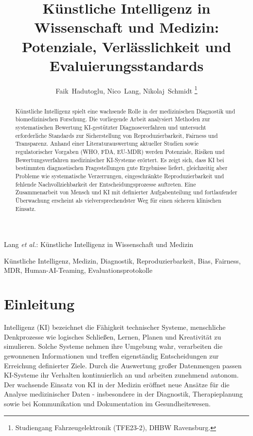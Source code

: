 \documentclass[lettersize,journal]{IEEEtran}
\begin{document}
\title{Künstliche Intelligenz in Wissenschaft und Medizin: 
	Potenziale, Verlässlichkeit und Evaluierungsstandards}

\author{Faik~Hadutoglu, Nico~Lang, Nikolaj~Schmidt%
	\thanks{Studiengang Fahrzeugelektronik (TFE23-2), DHBW Ravensburg.}%
}


%
{Lang \MakeLowercase{\textit{et al.}}: Künstliche Intelligenz in Wissenschaft und Medizin}

	
	\maketitle
	

\begin{abstract}
	Künstliche Intelligenz spielt eine wachsende Rolle in der medizinischen Diagnostik und biomedizinischen Forschung. Die vorliegende Arbeit analysiert Methoden zur systematischen Bewertung KI-gestützter Diagnoseverfahren und untersucht erforderliche Standards zur Sicherstellung von Reproduzierbarkeit, Fairness und Transparenz. Anhand einer Literaturauswertung aktueller Studien sowie regulatorischer Vorgaben (WHO, FDA, EU-MDR) werden Potenziale, Risiken und Bewertungsverfahren medizinischer KI-Systeme erörtert. Es zeigt sich, dass KI bei bestimmten diagnostischen Fragestellungen gute Ergebnisse liefert, gleichzeitig aber Probleme wie systematische Verzerrungen, eingeschränkte Reproduzierbarkeit und fehlende Nachvollziehbarkeit der Entscheidungsprozesse auftreten. Eine Zusammenarbeit von Mensch und KI mit definierter Aufgabenteilung und fortlaufender Überwachung erscheint als vielversprechendster Weg für einen sicheren klinischen Einsatz.
\end{abstract}




\begin{IEEEkeywords}
	Künstliche Intelligenz, Medizin, Diagnostik, Reproduzierbarkeit, Bias, Fairness, MDR, Human-AI-Teaming, Evaluationsprotokolle 
\end{IEEEkeywords}

	

\section{Einleitung}
 Intelligenz (KI) bezeichnet die Fähigkeit technischer Systeme, menschliche Denkprozesse wie logisches Schließen, Lernen, Planen und Kreativität zu simulieren. Solche Systeme nehmen ihre Umgebung wahr, verarbeiten die gewonnenen Informationen und treffen eigenständig Entscheidungen zur Erreichung definierter Ziele. Durch die Auswertung großer Datenmengen passen KI-Systeme ihr Verhalten kontinuierlich an und arbeiten zunehmend autonom\cite{ref:epai}. Der wachsende Einsatz von KI in der Medizin eröffnet neue Ansätze für die Analyse medizinischer Daten - insbesondere in der Diagnostik, Therapieplanung sowie bei Kommunikation und Dokumentation im Gesundheitswesen\cite{ref:baekki}. 
\end{document}
